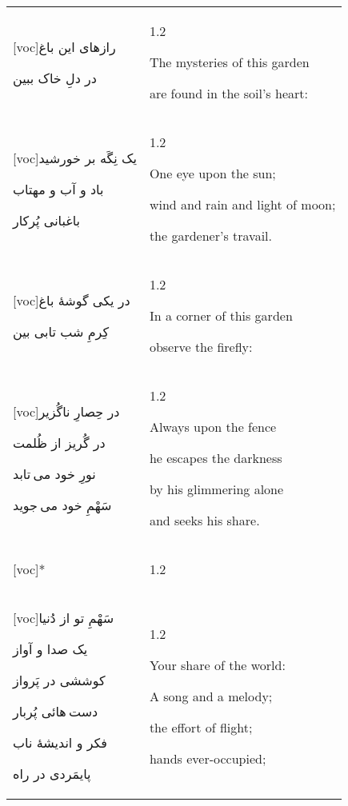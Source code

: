 \documentclass[11pt]{article}
\makeatletter
\newenvironment{orig}
  {\begin{farsi}[voc]}
  {\end{farsi}}
\newenvironment{trans}
  {\Large\begin{spacing}{1.2}\raggedright}
  {\end{spacing}}
\newenvironment{word}
  {\begin{longtable}[t]{p{2.75in}@{\hspace{3em}}p{2.875in}}}
  {\end{longtable}}
\newcommand{\ayat}[2]{\begin{orig}#1\end{orig} & \begin{trans}#2\end{trans}}
\makeatother
\begin{document}
\begin{word}
\ayat{رازهای این باغ

در دلِ خاک ببین}{
\vspace{1em}
The mysteries of this garden

are found in the soil’s heart:
} \vspace{-1ex}\\

\ayat{یک نِگَه بر خورشید

باد و آب و مهتاب

باغبانی پُرکار}{
\vspace{1em}
One eye upon the sun;

wind and rain and light of moon;

the gardener’s travail.
} \vspace{-1ex}\\

\ayat{در یکی گوشۀ باغ

کِرمِ شب تابی بین}{
\vspace{1em}
In a corner of this garden

observe the firefly:
} \vspace{-1ex}\\

\ayat{در حِصارِ ناگُزیر

در گُریز از ظُلمت

نورِ خود می تابد

سَهْمِ خود می جوید}{
\vspace{1em}
Always upon the fence

he escapes the darkness

by his glimmering alone

and seeks his share.
} \vspace{-1ex}\\

\ayat{*}{} \vspace{-1ex}\\

\ayat{سَهْمِ تو از دُنیا

یک صدا و آواز

کوششی در پَرواز

دست هائی پُربار

فکر و اندیشۀ ناب

پایمَردی در راه}{
\vspace{1em}
Your share of the world:

A song and a melody;

the effort of flight;

hands ever-occupied;

}
\end{word}
\end{document}
